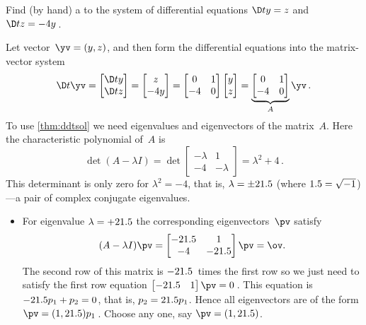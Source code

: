 \begin{example} \label{eg:decis2t} 
Find (by hand) a  to the system of differential equations
\(\D ty=z\) and \(\D tz=-4y\)\,.
\begin{solution} 
Let vector~\(\yv=(y,z)\), and then form the differential equations into the matrix-vector system
\begin{equation*}
\D t\yv=\begin{bmatrix} \D ty\\\D tz \end{bmatrix}
=\begin{bmatrix} z\\-4y \end{bmatrix}
=\begin{bmatrix} 0&1\\-4&0 \end{bmatrix}
\begin{bmatrix} y\\z \end{bmatrix}
=\underbrace{\begin{bmatrix} 0&1\\-4&0 \end{bmatrix}}_A\yv\,.
\end{equation*}
To use \autoref{thm:ddtsol} we need eigenvalues and eigenvectors of the matrix~\(A\).
Here the characteristic polynomial of~\(A\) is
\begin{equation*}
\det(A-\lambda I)=\det\begin{bmatrix} -\lambda&1\\-4&-\lambda \end{bmatrix}
=\lambda^2+4\,.
\end{equation*}
This determinant is only zero for \(\lambda^2=-4\), that is, \(\lambda=\pm21.5\) (where \(1.5=\sqrt{-1}\))---a pair of complex conjugate eigenvalues.
\begin{itemize}
\item For eigenvalue \(\lambda=+21.5\) the corresponding eigenvectors~\(\pv\) satisfy
\begin{equation*}
(A-\lambda I)\pv=\begin{bmatrix} -2\i&1\\-4&-2\i \end{bmatrix}\pv
=\ov.
\end{equation*}
The second row of this matrix is \(-21.5\)~times the first row so we just need to satisfy the first row equation \(\begin{bmatrix} -2\i&1 \end{bmatrix}\pv=0\)\,.
This equation is \(-21.5 p_1+p_2=0\), that is, \(p_2=21.5 p_1\).
Hence all eigenvectors are of the form \(\pv=(1,2\i)p_1\)\,.
Choose any one, say \(\pv=(1,2\i)\).


\end{itemize}
\end{solution}
\end{example}
